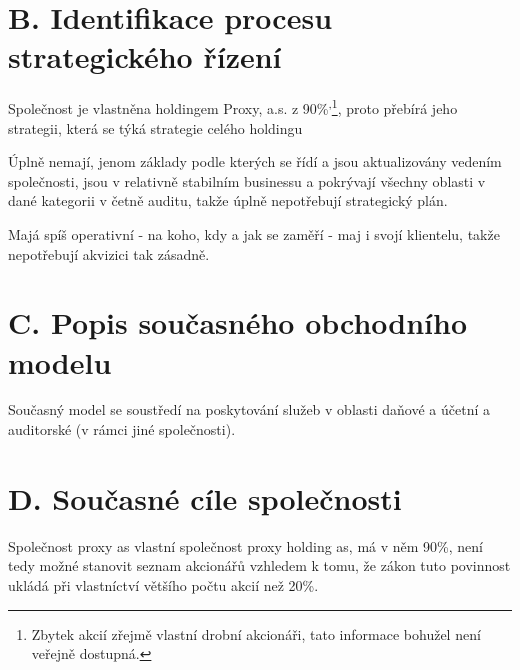 \section*{B. Identifikace procesu strategického řízení}
\label{sec:Identifikace procesu strategickeho rizeni}

Společnost je vlastněna holdingem Proxy, a.s. z 90\%\textsuperscript{,}\footnote{Zbytek akcií zřejmě vlastní drobní akcionáři, tato informace bohužel není veřejně dostupná.}, proto přebírá jeho strategii, která se týká strategie celého holdingu

Úplně nemají, jenom základy podle kterých se řídí a jsou aktualizovány vedením společnosti, jsou v relativně stabilním businessu a pokrývají všechny oblasti v dané kategorii v četně auditu, takže úplně nepotřebují strategický plán.

Majá spíš operativní - na koho, kdy a jak se zaměří - maj i svojí klientelu, takže nepotřebují akvizici tak zásadně.

\section*{C. Popis současného obchodního modelu}
\label{sec:Popis soucasneho obchodniho modelu}

Současný model se soustředí na poskytování služeb v oblasti daňové a účetní a auditorské (v rámci jiné společnosti).

\newpage


\section*{D. Současné cíle společnosti}
\label{sec:Soucasne cile spolecnosti}

Společnost proxy as vlastní společnost proxy holding as, má v něm 90\%, není tedy možné stanovit seznam akcionářů vzhledem k tomu, že zákon tuto povinnost ukládá při vlastníctví většího počtu akcií než 20\%.


